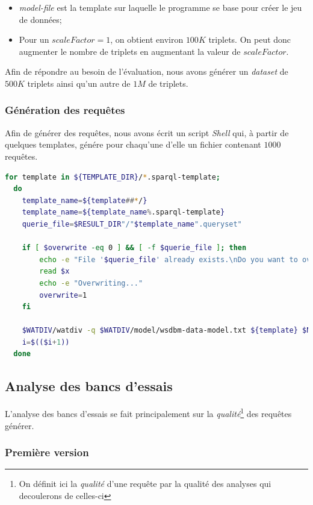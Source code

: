 \documentclass[12pt,titlepage]{article}
\begin{document}
\begin{itemize}
  \item \textit{model-file} est la template sur laquelle le programme se base pour créer le jeu de données;
  \item Pour un $scaleFactor = 1$, on obtient environ $100K$ triplets. On peut donc augmenter le nombre de triplets en augmentant la valeur de $scaleFactor$.
\end{itemize}

Afin de répondre au besoin de l'évaluation, nous avons générer un \textit{dataset} de $500K$ triplets ainsi qu'un autre de $1M$ de triplets.

\subsubsection{Génération des requêtes}

Afin de générer des requêtes, nous avons écrit un script \textit{Shell} qui, à partir de quelques templates, génére pour chaqu'une d'elle un fichier contenant $1000$ requêtes.

\begin{lstlisting}[language=bash, caption="Extrait du script qui génére les requêtes]
  for template in ${TEMPLATE_DIR}/*.sparql-template;
  do 
    template_name=${template##*/}
    template_name=${template_name%.sparql-template}
    querie_file=$RESULT_DIR"/"$template_name".queryset"

    if [ $overwrite -eq 0 ] && [ -f $querie_file ]; then
        echo -e "File '$querie_file' already exists.\nDo you want to overwrite ? (any key to continue / CTRL-C to exit)"
        read $x
        echo -e "Overwriting..."
        overwrite=1
    fi

    $WATDIV/watdiv -q $WATDIV/model/wsdbm-data-model.txt ${template} $NB_QUERIES 1 > $querie_file
    i=$(($i+1))
  done
\end{lstlisting}

\subsection{Analyse des bancs d’essais}

L'analyse des bancs d'essais se fait principalement sur la \textit{qualité}\footnote{On définit ici la \textit{qualité} d'une requête par la qualité des analyses qui decoulerons de celles-ci} des requêtes générer.

\subsubsection{Première version}
\end{document}
